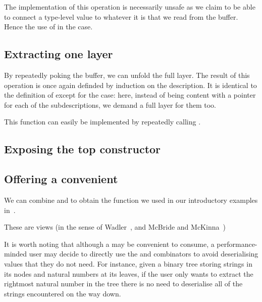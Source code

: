 

The implementation of this operation is necessarily unsafe as we claim
to be able to connect a type-level value to whatever it is that we read
from the buffer. Hence the use of \believeMe{} in the 
case.



\subsection{Extracting one layer}

By repeatedly poking the buffer, we can unfold the full layer.
The result of this operation is once again definded by induction
on the description. It is identical to the definition of
 except for the  case:
here, instead of being content with a pointer for each of the
subdescriptions, we demand a full layer for them too.


This function can easily be implemented by repeatedly calling
.


\subsection{Exposing the top constructor}





\subsection{Offering a convenient }

We can combine  and  to obtain
the  function we used in our introductory examples
in~.



These are views
(in the sense of Wadler~\cite{DBLP:conf/popl/Wadler87},
and McBride and McKinna~\cite{DBLP:journals/jfp/McBrideM04})


It is worth noting that although a  may be
convenient to consume, a performance-minded user may decide to
directly use the  and 
combinators to avoid deserialising values that they do not need.
%
For instance, given a binary tree storing strings in its nodes and
natural numbers at its leaves, if the user only wants to extract the
rightmost natural number in the tree there is no need to deserialise
all of the strings encountered on the way down.

